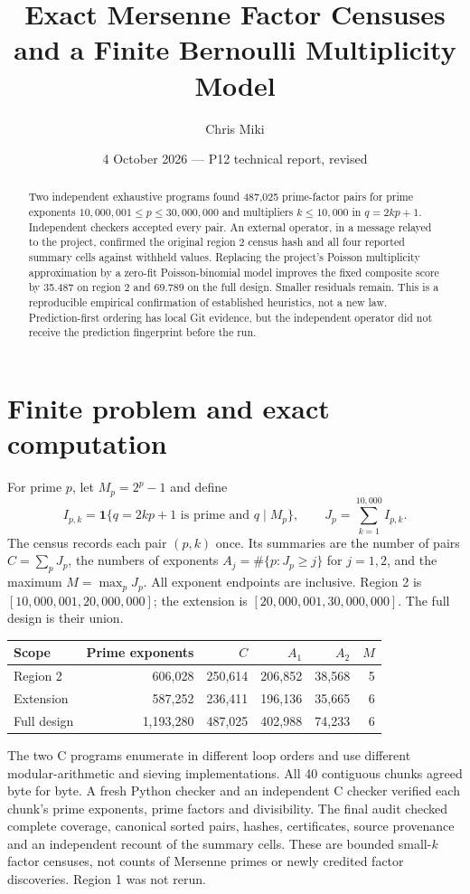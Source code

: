 \documentclass[11pt,a4paper]{article}
\title{Exact Mersenne Factor Censuses\\and a Finite Bernoulli Multiplicity Model}
\author{Chris Miki}
\date{4 October 2026 \quad\textnormal{--- P12 technical report, revised}}
\begin{document}
\maketitle
\begin{abstract}
Two independent exhaustive programs found 487,025 prime-factor pairs
for prime exponents $10{,}000{,}001\le p\le30{,}000{,}000$ and multipliers
$k\le10{,}000$ in $q=2kp+1$. Independent checkers accepted every pair.
An external operator, in a message relayed to the project, confirmed the
original region 2 census hash and all four reported summary cells against
withheld values. Replacing the project's Poisson multiplicity approximation
by a zero-fit Poisson-binomial model improves the fixed composite score by
35.487 on region 2 and 69.789 on the full design. Smaller residuals remain.
This is a reproducible empirical confirmation of established heuristics, not
a new law. Prediction-first ordering has local Git evidence, but the
independent operator did not receive the prediction fingerprint before the run.
\end{abstract}

\section{Finite problem and exact computation}
For prime $p$, let $M_p=2^p-1$ and define
\[
 I_{p,k}=\mathbf{1}\{q=2kp+1\text{ is prime and }q\mid M_p\},
 \qquad J_p=\sum_{k=1}^{10{,}000}I_{p,k}.
\]
The census records each pair $(p,k)$ once. Its summaries are the number of
pairs $C=\sum_pJ_p$, the numbers of exponents $A_j=\#\{p:J_p\ge j\}$
for $j=1,2$, and the maximum $M=\max_pJ_p$. All exponent endpoints are inclusive.
Region 2 is $[10{,}000{,}001,20{,}000{,}000]$; the extension is
$[20{,}000{,}001,30{,}000{,}000]$. The full design is their union.

\begin{center}\small
\begin{tabular}{lrrrrr}
\toprule
Scope & Prime exponents & $C$ & $A_1$ & $A_2$ & $M$\\
\midrule
Region 2 & 606,028 & 250,614 & 206,852 & 38,568 & 5\\
Extension & 587,252 & 236,411 & 196,136 & 35,665 & 6\\
Full design & 1,193,280 & 487,025 & 402,988 & 74,233 & 6\\
\bottomrule
\end{tabular}
\end{center}

The two C programs enumerate in different loop orders and use different
modular-arithmetic and sieving implementations. All 40 contiguous chunks
agreed byte for byte. A fresh Python checker and an independent C checker
verified each chunk's prime exponents, prime factors and divisibility.
The final audit checked complete coverage, canonical sorted pairs, hashes,
certificates, source provenance and an independent recount of the summary
cells. These are bounded small-$k$ factor censuses, not counts of Mersenne
primes or newly credited factor discoveries. Region 1 was not rerun.
\end{document}

